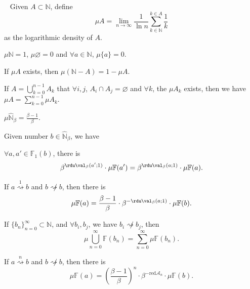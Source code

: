 \begin{definition}~\label{def:logarithmic-density}
	Given $A \subset \mathbb{N}$, define
	\[ \mu A = \lim_{n\to\infty}\frac{1}{\ln n}\sum_{k\in\mathbb{N}}^{k\in A}\frac{1}{k} \]
	as the logarithmic density of $A$.
\end{definition}
\begin{proposition}
	$\mu\mathbb{N} = 1$, $\mu\varnothing = 0$ and $\forall a \in\mathbb{N}$, $\mu\{a\} = 0$.
\end{proposition}
\begin{proposition}
	If $\mu{A}$ exists, then $\mu(\mathbb{N} - A) = 1 - \mu{A}$.
\end{proposition}
\begin{proposition}
	If $A = \bigcup_{k=0}^{n-1}A_{k}$ that $\forall i, j$, $A_{i}\cap A_{j} = \varnothing$ and $\forall k$, the $\mu{A_k}$ exists, then we have $\mu{A} = \sum_{k=0}^{n-1}\mu{A_{k}}$.
\end{proposition}
\begin{proposition}
	$\mu\widehat{\mathbb{N}}_{{\beta}} = \frac{\beta - 1}{\beta}$.
\end{proposition}
Given number $b \in\widehat{\mathbb{N}}_{{\beta}}$, we have
\begin{proposition}
	$\forall a, a' \in \mathbb{F}_{1}(b)$, there is
	\[ \beta^{\rdu\val_{\beta}(a';1)}\cdot\mu\mathbb{F}(a') = \beta^{\rdu\val_{\beta}(a;1)}\cdot\mu\mathbb{F}(a). \]
\end{proposition}
\begin{proposition}
	If $a \overset{1}{\rightsquigarrow} b$ and $b \not\rightsquigarrow b$, then there is
	\[ \mu\mathbb{F}(a) = \frac{\beta - 1}{\beta}\cdot\beta^{-\rdu\val_{\beta}(a;1)}\cdot\mu\mathbb{F}(b). \]
\end{proposition}
\begin{proposition}
	If $\{b_n\}_{n=0}^{\infty} \subset \mathbb{N}$, and $\forall b_i, b_j$, we have $b_i \not\rightsquigarrow b_j$, then
	\[ \mu\bigcup_{n=0}^{\infty}\mathbb{F}(b_n) = \sum_{n=0}^{\infty}\mu\mathbb{F}(b_n). \]
\end{proposition}

\begin{proposition}
	If $a \overset{n}{\rightsquigarrow} b$ and $b \not\rightsquigarrow b$, then there is
	\[ \mu\mathbb{F}(a) = \left(\frac{\beta - 1}{\beta}\right)^{n} \cdot \beta^{-\mathrm{red}\mathcal{A}_n}\cdot\mu\mathbb{F}(b). \]
\end{proposition}